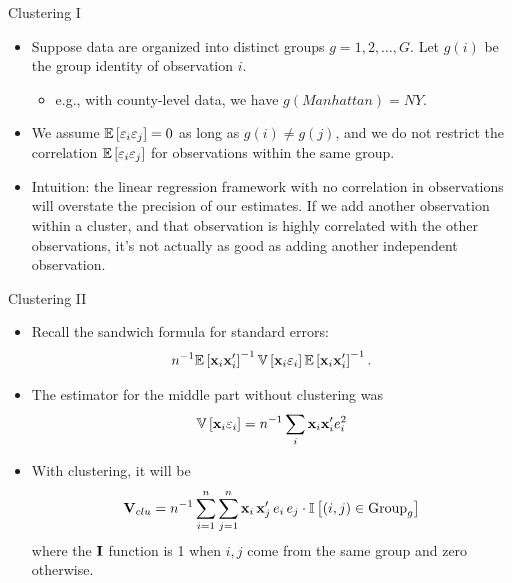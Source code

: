 \begin{frame}{Clustering I}
\begin{itemize}
	\item Suppose data are organized into distinct groups $g=1,2,\dots,G$. Let $g\left(i\right)$
	be the group identity of observation $i$. 
	\begin{itemize}
		\item e.g., with county-level data, we have $g\left(Manhattan\right)=NY$.
	\end{itemize}


	\medskip
	\item We assume $\mathbb{E}\left[\varepsilon_i \varepsilon_j\right]=0$ as long as $g\left(i\right)\ne g\left(j\right)$,
	and we do not restrict the correlation $\mathbb{E}\left[\varepsilon_i \varepsilon_j\right]$
	for observations within the same group.

	\medskip
	\item Intuition: the linear regression framework with no correlation in observations will overstate
	the precision of our estimates. If we add another observation within a cluster, and that observation
	is highly correlated with the other observations, it's not actually as good as adding another independent observation. 
\end{itemize}
\end{frame}

\begin{frame}{Clustering II}
\begin{itemize}
	\item Recall the sandwich formula for standard errors:\[
		n^{-1} \mathbb{E}\left[{\bf x}_i {\bf x}'_i\right]^{-1} \mathbb{V}\left[{\bf x}_i \varepsilon_i \right] \mathbb{E}\left[{\bf x}_i {\bf x}'_i\right]^{-1}.
	\]

	\item The estimator for the middle part without clustering was\[
	{\bf \mathbb{V}}\left[{\bf x}_i \varepsilon_i \right] = n^{-1} \sum_{i} {\bf x}_i {\bf x}'_i  e_i^2
	\]

	\item With clustering, it will be \[
	{\bf V}_{clu} = n^{-1} \sum_{i=1}^{n}\sum_{j=1}^{n} {\bf x}_i\,  {\bf x}'_j \, e_i\, e_j \cdot {\mathbb{I}}\left[(i,j) \in \text{Group}_g \right]
	\]
	where the ${\bf I}$ function is 1 when $i,j$ come from the same group and zero otherwise.

\end{itemize}
\end{frame}



